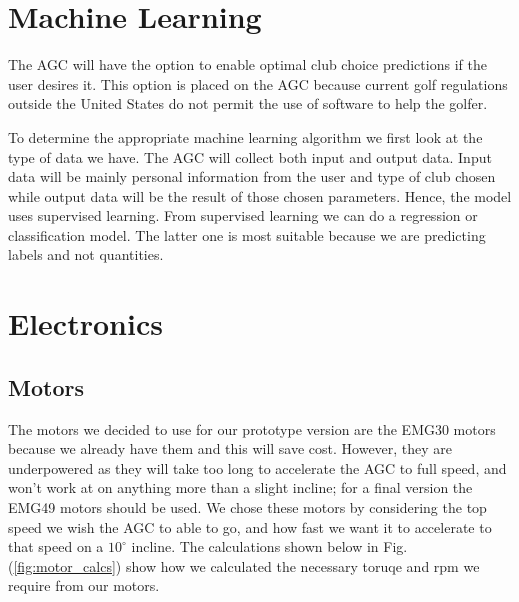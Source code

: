 \documentclass[11pt,landscape]{article}
\begin{document}
\begin{multicols}{3}
\section{Machine Learning}
The AGC will have the option to enable optimal club choice predictions if the
user desires it. This option is placed on the AGC because current golf
regulations outside the United States do not permit the use of software to help
the golfer.

To determine the appropriate machine learning algorithm we first look at the
type of data we have. The AGC will collect both input and output data. Input
data will be mainly personal information from the user and type of club chosen
while output data will be the result of those chosen parameters. Hence, the
model uses supervised learning. From supervised learning we can do a regression
or classification model. The latter one is most suitable because we are
predicting labels and not quantities.


\section{Electronics}
\label{electronics}
\subsection{Motors}
The motors we decided to use for our prototype version are the EMG30 motors
because we already have them and this will save cost. However, they are
underpowered as they will take too long to accelerate the AGC to full speed, and
won't work at on anything more than a slight incline; for a final version the
EMG49 motors should be used. 
We chose these motors
by
considering the top speed we wish the AGC to able to go, and how fast we want it
to accelerate to that speed on a $10^\circ$ incline. The calculations shown below in
Fig. (\ref{fig:motor_calcs}) show how we calculated the necessary toruqe and rpm we require from our
motors.


\end{multicols}
\end{document}

